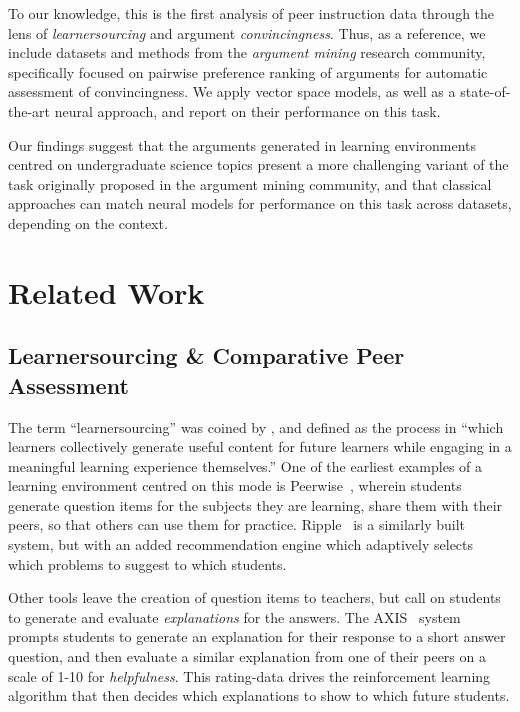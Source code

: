 \documentclass[runningheads]{llncs}
\begin{document}
To our knowledge, this is the first analysis of peer instruction data through 
the lens of \textit{learnersourcing} and argument \textit{convincingness}.
Thus, as a reference, we include datasets and methods from the \textit{argument 
mining} research community, specifically focused on pairwise preference ranking 
of arguments for automatic assessment of convincingness.
We apply vector space models, as well as a state-of-the-art neural approach, 
and report on their performance on this task.

Our findings suggest that the arguments generated in learning environments 
centred on undergraduate science topics present a more challenging variant of 
the task originally proposed in the argument mining community, and that 
classical approaches can match neural models for performance on this task 
across datasets, depending on the context.

\section{Related Work}


\subsection{Learnersourcing \& Comparative Peer Assessment}
The term ``learnersourcing'' was coined by \cite{weir_learnersourcing_2015}, 
and defined as the process in ``which learners collectively generate useful 
content for future learners while engaging in a meaningful learning experience 
themselves.'' 
One of the earliest examples of a learning environment centred on this mode is  
Peerwise~\cite{denny_peerwise:_2008}, wherein students generate question items 
for the subjects they are learning, share them with their peers, so that others 
can use them for practice. 
Ripple~\cite{khosravi_ripple_2019} is a similarly built system, but with an 
added recommendation engine which adaptively selects which problems to suggest 
to which students.

Other tools leave the creation of question items to teachers, but call on 
students to generate and evaluate \textit{explanations} for the answers.
The AXIS~\cite{williams_axis:_2016} system prompts students to
generate an explanation for their response to a short answer question, and then 
evaluate a similar explanation from one of their peers on a scale of 1-10 for 
\textit{helpfulness}. This rating-data drives the reinforcement learning 
algorithm that then decides which explanations to show to which future students.
\end{document}

